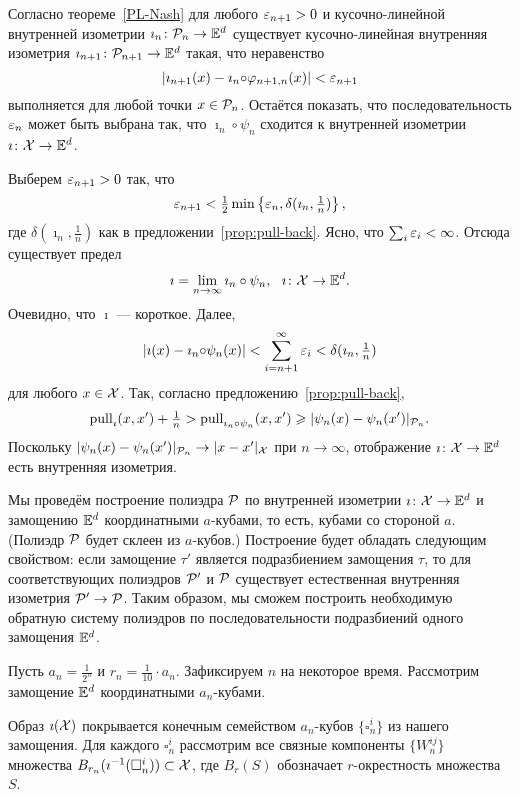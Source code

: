 \documentclass[oneside,a4paper]{article}
\begin{document}
Согласно теореме~\ref{PL-Nash}
для любого $\varepsilon_{n+1}>0$ и кусочно-линейной внутренней изометрии $\imath_n\:\spc{P}_n\z\to \EE^d$
существует кусочно-линейная внутренняя изометрия 
$\imath_{n+1}\:\spc{P}_{n+1}\z\to \EE^d$ такая, что неравенство
$$|\imath_{n+1}(x)- \imath_{n}{\circ}\varphi_{n+1,n}(x)|<\varepsilon_{n+1}$$
выполняется для любой точки $x\in \mathcal{P}_n$.
Остаётся показать, что последовательность $\varepsilon_{n}$ может быть выбрана так, 
что $\imath_n{\circ}\psi_n$ сходится к внутренней изометрии $\imath\:\spc{X}\z\to\EE^d$.

Выберем  
$\varepsilon_{n+1}>0$ так, что 
$$\varepsilon_{n+1}<\tfrac12\min\left\{\varepsilon_n,\delta(\imath_n,\tfrac1n)\right\},$$
где $\delta(\imath_n,\tfrac1n)$ как в предложении~\ref{prop:pull-back}.
Ясно, что $\sum_i\varepsilon_i<\infty$. 
Отсюда существует предел
$$\imath=\lim_{n\to\infty} \imath_n\circ\psi_n,\ \ \imath\colon\mathcal{X}\to\mathbb{E}^d.$$
Очевидно, что $\imath$ --- короткое.
Далее,
$$|\imath(x)- \imath_n{\circ}\psi_n(x)|< \sum_{i=n+1}^\infty\varepsilon_i<\delta(\imath_n,\tfrac1n)$$ 
для любого $x\in \mathcal{X}$.
Так, согласно предложению~\ref{prop:pull-back},
$$\mathop{\rm pull}\nolimits_{\imath}(x,x')+\tfrac1n
>
\mathop{\rm pull}\nolimits_{\imath_n\circ\psi_n}(x,x')
\geqslant
|\psi_n(x)-\psi_n(x')|_{\mathcal{P}_n}.$$
Поскольку $|\psi_n(x)-\psi_n(x')|_{\mathcal{P}_n}\to |x-x'|_{\mathcal{X}}$ при $n\to\infty$, отображение $\imath\colon\mathcal{X}\to\mathbb{E}^d$ есть внутренняя изометрия.\qeds


Мы проведём построение полиэдра $\mathcal{P}$ 
по внутренней изометрии $\imath\colon \mathcal{X}\to \mathbb{E}^d$ и замощению $\mathbb{E}^d$ координатными $a$-кубами,
то есть, кубами со стороной $a$.
(Полиэдр $\mathcal{P}$ будет склеен из $a$-кубов.)
Построение будет обладать следующим свойством:
если замощение $\tau'$ является подразбиением замощения $\tau$, то для соответствующих полиэдров $\mathcal{P}'$ и $\mathcal{P}$ существует естественная внутренняя изометрия $\mathcal{P}'\to \mathcal{P}$. 
Таким образом, мы сможем построить необходимую обратную систему полиэдров по последовательности подразбиений одного замощения $\mathbb{E}^d$.

Пусть $a_n=\tfrac{1}{2^{n}}$ и $r_n=\tfrac{1}{10}\cdot a_n$.
Зафиксируем $n$ на некоторое время.
Рассмотрим замощение $\mathbb{E}^d$ координатными $a_n$-кубами.

Образ $\imath(\mathcal{X})$ покрывается конечным семейством $a_n$-кубов $\{\square_{n}^i\}$ из нашего замощения.
Для каждого $\square_{n}^i$ рассмотрим все связные компоненты $\{W^{i j}_n\}$ множества
$B_{r_n}(\imath^{-1}(\square_{n}^i))\subset \mathcal{X}$,
где $B_r(S)$ обозначает $r$-окрестность множества $S$.
\end{document}

